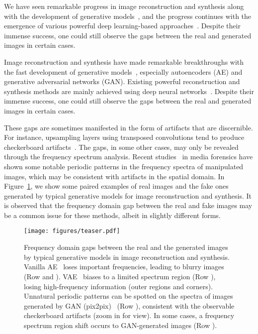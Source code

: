 \documentclass[10pt,twocolumn,letterpaper]{article}
\begin{document}
We have seen remarkable progress in image reconstruction and synthesis along with the development of generative models~\cite{ae,vae,GAN,glow,pixelcnn}, and the progress continues with the emergence of various powerful deep learning-based approaches~\cite{stylegan2,SPADE,alae,nvae}. 
Despite their immense success, one could still observe the gaps between the real and generated images in certain cases.




Image reconstruction and synthesis have made remarkable breakthroughs with the fast development of generative models~\cite{ae,vae,GAN,glow,pixelcnn}, especially autoencoders (AE) and generative adversarial networks (GAN).
Existing powerful reconstruction and synthesis methods are mainly achieved using deep neural networks~\cite{stylegan2,SPADE,alae,nvae}.
Despite their immense success, one could still observe the gaps between the real and generated images in certain cases.
\fi




These gaps are sometimes manifested in the form of artifacts that are discernible. 
For instance, upsampling layers using transposed convolutions tend to produce checkerboard artifacts~\cite{checkerboardarti}. The gaps, in some other cases, may only be revealed through the frequency spectrum analysis. Recent studies~\cite{cnndetection,artifactsganfake,fakeretouch} in media forensics have shown some notable periodic patterns in the frequency spectra of manipulated images, which may be consistent with artifacts in the spatial domain.
In Figure~\ref{fig:teaser}, we show some paired examples of real images and the fake ones generated by typical generative models for image reconstruction and synthesis.
It is observed that the frequency domain gap between the real and fake images may be a common issue for these methods, albeit in slightly different forms.



\begin{figure}[t]
	\centering
\texttt{[image: figures/teaser.pdf]}
\caption{Frequency domain gaps between the real and the generated images by typical generative models in image reconstruction and synthesis. Vanilla AE~\cite{ae} loses important frequencies, leading to blurry images (Row  and ). VAE~\cite{vae} biases to a limited spectrum region (Row ), losing high-frequency information (outer regions and corners). Unnatural periodic patterns can be spotted on the spectra of images generated by GAN (pix2pix)~\cite{pix2pix} (Row ), consistent with the observable checkerboard artifacts (zoom in for view). In some cases, a frequency spectrum region shift occurs to GAN-generated images (Row ).}
	\label{fig:teaser}
	\vspace{-0.4cm}
\end{figure}
\end{document}
